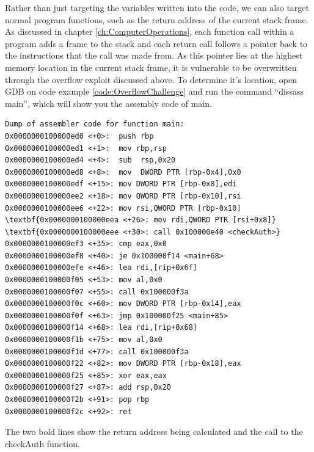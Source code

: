 \documentclass[a4paper,11pt]{report}
\begin{document}
			Rather than just targeting the variables written into the code, we can also target normal program functions,
			such as the return address of the current stack frame. 
			As discussed in chapter \ref{ch:ComputerOperations}, 
			each function call within a program adds a frame to the stack and each return call follows a pointer back to the instructions that the call was made from. 
			As this pointer lies at the highest memory location in the current stack frame, it is vulnerable to be overwritten through the overflow exploit discussed above. 
			To determine it's location, open GDB on code example \ref{code:OverflowChallenge} and run the command ``dissass main'', which will show you the assembly code of main. 
		\begin{Verbatim}[commandchars=\\\{\}]
Dump of assembler code for function main:
0x0000000100000ed0 <+0>:  push rbp
0x0000000100000ed1 <+1>:  mov rbp,rsp
0x0000000100000ed4 <+4>:  sub  rsp,0x20
0x0000000100000ed8 <+8>:  mov  DWORD PTR [rbp-0x4],0x0
0x0000000100000edf <+15>: mov DWORD PTR [rbp-0x8],edi
0x0000000100000ee2 <+18>: mov QWORD PTR [rbp-0x10],rsi
0x0000000100000ee6 <+22>: mov rsi,QWORD PTR [rbp-0x10]
\textbf{0x0000000100000eea <+26>: mov rdi,QWORD PTR [rsi+0x8]}
\textbf{0x0000000100000eee <+30>: call 0x100000e40 <checkAuth>}
0x0000000100000ef3 <+35>: cmp eax,0x0
0x0000000100000ef8 <+40>: je 0x100000f14 <main+68>
0x0000000100000efe <+46>: lea rdi,[rip+0x6f]        
0x0000000100000f05 <+53>: mov al,0x0
0x0000000100000f07 <+55>: call 0x100000f3a
0x0000000100000f0c <+60>: mov DWORD PTR [rbp-0x14],eax
0x0000000100000f0f <+63>: jmp 0x100000f25 <main+85>
0x0000000100000f14 <+68>: lea rdi,[rip+0x68]        
0x0000000100000f1b <+75>: mov al,0x0
0x0000000100000f1d <+77>: call 0x100000f3a
0x0000000100000f22 <+82>: mov DWORD PTR [rbp-0x18],eax
0x0000000100000f25 <+85>: xor eax,eax
0x0000000100000f27 <+87>: add rsp,0x20
0x0000000100000f2b <+91>: pop rbp
0x0000000100000f2c <+92>: ret
		\end{Verbatim}
		The two bold lines show the return address being calculated and the call to the checkAuth function. %

		
\end{document}
